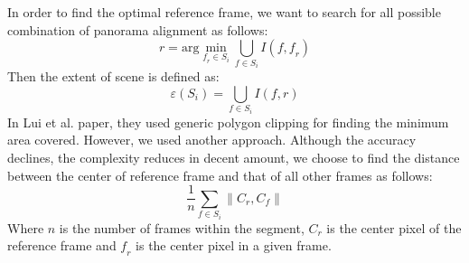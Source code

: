 \documentclass[12pt]{article}
\begin{document}
In order to find the optimal reference frame, we want to search for all possible combination of panorama alignment as follows:
\begin{equation}
\mathit{r} = \mathrm{arg} \min_{\mathit{f_r} \in \mathit{S_i}} \bigcup_{\mathit{f} \in \mathit{S_i}} \mathit{I(f, f_r)}
\end{equation}
Then the extent of scene is defined as:
\begin{equation}
\varepsilon(\mathit{S_i}) = \bigcup_{\mathit{f} \in \mathit{S_i}} \mathit{I(f, r)}
\end{equation}
In Lui et al. paper, they used generic polygon clipping for finding the minimum area covered. However, we used another approach.  Although the accuracy declines, the complexity reduces in decent amount, we choose to find the distance between the center of reference frame and that of all other frames as follows:
\begin{equation}
\frac{1}{\mathit{n}} \sum_{\mathit{f \in S_i}}  \lVert \mathit{C_r}, \mathit{C_f} \rVert
\end{equation}
Where $\mathit{n}$ is the number of frames within the segment, $\mathit{C_r}$ is the center pixel of the reference frame and $\mathit{f_r}$ is the center pixel in a given frame.
\end{document}
